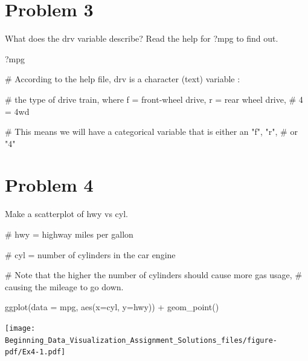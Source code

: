 \documentclass[
  letterpaper,
  DIV=11,
  numbers=noendperiod]{scrreprt}
\newenvironment{Shaded}{\begin{snugshade}}{\end{snugshade}}
\newcommand{\AttributeTok}[1]{\textcolor[rgb]{0.40,0.45,0.13}{#1}}
\newcommand{\CommentTok}[1]{\textcolor[rgb]{0.37,0.37,0.37}{#1}}
\newcommand{\FunctionTok}[1]{\textcolor[rgb]{0.28,0.35,0.67}{#1}}
\newcommand{\NormalTok}[1]{\textcolor[rgb]{0.00,0.23,0.31}{#1}}
\newcommand{\SpecialCharTok}[1]{\textcolor[rgb]{0.37,0.37,0.37}{#1}}
\begin{document}
\section*{Problem 3}\label{problem-3-3}


What does the drv variable describe? Read the help for ?mpg to find out.

\begin{Shaded}
\begin{Highlighting}[]
\NormalTok{?mpg}

\CommentTok{\# According to the help file, drv is a character (text) variable : }

\CommentTok{\# the type of drive train, where f = front{-}wheel drive, r = rear wheel drive, }
\CommentTok{\# 4 = 4wd}

\CommentTok{\# This means we will have a categorical variable that is either an "f", "r",}
\CommentTok{\# or "4"}
\end{Highlighting}
\end{Shaded}

\section*{Problem 4}\label{problem-4-3}


Make a scatterplot of hwy vs cyl.

\begin{Shaded}
\begin{Highlighting}[]
\CommentTok{\# hwy = highway miles per gallon}

\CommentTok{\# cyl = number of cylinders in the car engine }

\CommentTok{\# Note that the higher the number of cylinders should cause more gas usage,}
\CommentTok{\# causing the mileage to go down.}

\FunctionTok{ggplot}\NormalTok{(}\AttributeTok{data =}\NormalTok{ mpg, }\FunctionTok{aes}\NormalTok{(}\AttributeTok{x=}\NormalTok{cyl, }\AttributeTok{y=}\NormalTok{hwy)) }\SpecialCharTok{+}
  \FunctionTok{geom\_point}\NormalTok{()}
\end{Highlighting}
\end{Shaded}

\texttt{[image: Beginning\_Data\_Visualization\_Assignment\_Solutions\_files/figure-pdf/Ex4-1.pdf]}
\end{document}
